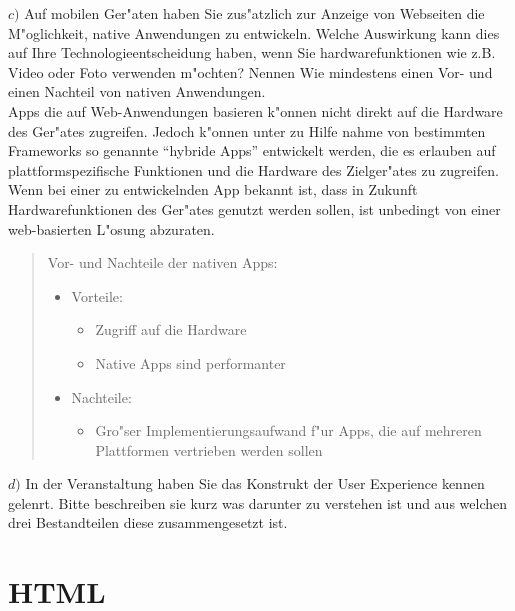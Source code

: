 \noindent
$c)$ Auf mobilen Ger"aten haben Sie zus"atzlich zur Anzeige von Webseiten die M"oglichkeit, native Anwendungen zu entwickeln.
Welche Auswirkung kann dies auf Ihre Technologieentscheidung haben, wenn Sie hardwarefunktionen wie z.B. Video oder Foto verwenden m"ochten?
Nennen Wie mindestens einen Vor- und einen Nachteil von nativen Anwendungen.\\
    Apps die auf Web-Anwendungen basieren k"onnen nicht direkt auf die Hardware des Ger"ates zugreifen.
    Jedoch k"onnen unter zu Hilfe nahme von bestimmten Frameworks so genannte "`hybride Apps"' entwickelt werden, die es erlauben auf plattformspezifische Funktionen und die Hardware des Zielger"ates zu zugreifen.\\
Wenn bei einer zu entwickelnden App bekannt ist, dass in Zukunft Hardwarefunktionen des Ger"ates genutzt werden sollen, ist unbedingt von einer web-basierten L"osung abzuraten.\\
\begin{quote}
    \noindent
    Vor- und Nachteile der nativen Apps:
    \begin{itemize}
        \item Vorteile:
        \begin{itemize}
            \item Zugriff auf die Hardware
            \item Native Apps sind performanter
        \end{itemize}
        \item Nachteile:
        \begin{itemize}
            \item Gro"ser Implementierungsaufwand f"ur Apps, die auf mehreren Plattformen vertrieben werden sollen
        \end{itemize}
    \end{itemize}
\end{quote}
\bigskip

\noindent
$d)$ In der Veranstaltung haben Sie das Konstrukt der User Experience kennen gelenrt.
Bitte beschreiben sie kurz was darunter zu verstehen ist und aus welchen drei Bestandteilen diese zusammengesetzt ist.\\
\begin{quote}
\end{quote}
\bigskip



\section{HTML}

